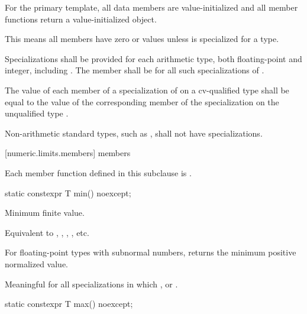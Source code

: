 \pnum
For the
primary template, all data members are value-initialized and all
member functions return a value-initialized object.
\begin{note}
This means all members have zero or  values
unless  is specialized for a type.
\end{note}

\pnum
Specializations shall be provided for each
arithmetic type,
both floating-point and integer, including
.
The member
shall be
for all such specializations of
.

\pnum
The value of each member of a specialization of
 on a cv-qualified type
 shall be equal to the value of the corresponding member of
the specialization on the unqualified type .

\pnum
Non-arithmetic standard types, such as
, shall not have specializations.

[numeric.limits.members]{ members}

\pnum
{}%
Each member function defined in this subclause is .

%
\begin{itemdecl}
static constexpr T min() noexcept;
\end{itemdecl}

\begin{itemdescr}
\pnum
Minimum finite value.
\begin{footnote}
Equivalent to , ,
, , etc.
\end{footnote}

%
\pnum
For floating-point types with subnormal numbers, returns the minimum positive
normalized value.

\pnum
Meaningful for all specializations in which
,
or
.
\end{itemdescr}

%
\begin{itemdecl}
static constexpr T max() noexcept;
\end{itemdecl}

